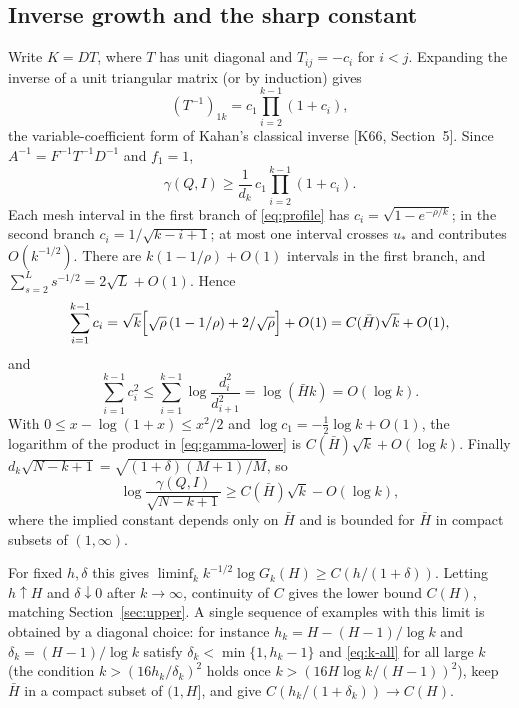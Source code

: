 \documentclass[11pt,a4paper]{article}
\theoremstyle{definition}
\numberwithin{equation}{section}
\begin{document}
\subsection{Inverse growth and the sharp constant}
Write $K=DT$, where $T$ has unit diagonal and $T_{ij}=-c_i$ for $i<j$. Expanding the inverse of a unit triangular
matrix (or by induction) gives
\begin{equation}\label{eq:Tinv}
 (T^{-1})_{1k}=c_1\prod_{i=2}^{k-1}(1+c_i),
\end{equation}
the variable-coefficient form of Kahan's classical inverse [K66, Section~5]. Since $A^{-1}=F^{-1}T^{-1}D^{-1}$ and
$f_1=1$,
\begin{equation}\label{eq:gamma-lower}
 \gamma(Q,I)\ge\frac1{d_k}\,c_1\prod_{i=2}^{k-1}(1+c_i).
\end{equation}
Each mesh interval in the first branch of \eqref{eq:profile} has $c_i=\sqrt{1-e^{-\rho/k}}$; in the second branch
$c_i=1/\sqrt{k-i+1}$; at most one interval crosses $u_*$ and contributes $O(k^{-1/2})$. There are
$k(1-1/\rho)+O(1)$ intervals in the first branch, and $\sum_{s=2}^Ls^{-1/2}=2\sqrt L+O(1)$. Hence
\begin{equation}\label{eq:sum-c}
 \sum_{i=1}^{k-1}c_i=\sqrt k\Bigl[\sqrt\rho\,(1-1/\rho)+2/\sqrt\rho\Bigr]+O(1)=C(\bar H)\sqrt k+O(1),
\end{equation}
and
\begin{equation}\label{eq:sum-c2}
 \sum_{i=1}^{k-1}c_i^2\le\sum_{i=1}^{k-1}\log\frac{d_i^2}{d_{i+1}^2}=\log(\bar Hk)=O(\log k).
\end{equation}
With $0\le x-\log(1+x)\le x^2/2$ and $\log c_1=-\tfrac12\log k+O(1)$, the logarithm of the product in
\eqref{eq:gamma-lower} is $C(\bar H)\sqrt k+O(\log k)$. Finally $d_k\sqrt{N-k+1}=\sqrt{(1+\delta)(M+1)/M}$, so
\begin{equation}\label{eq:lower-final}
 \log\frac{\gamma(Q,I)}{\sqrt{N-k+1}}\ge C(\bar H)\sqrt k-O(\log k),
\end{equation}
where the implied constant depends only on $\bar H$ and is bounded for $\bar H$ in compact subsets of $(1,\infty)$.

For fixed $h,\delta$ this gives $\liminf_k k^{-1/2}\log G_k(H)\ge C(h/(1+\delta))$. Letting $h\uparrow H$ and
$\delta\downarrow0$ after $k\to\infty$, continuity of $C$ gives the lower bound $C(H)$, matching
Section~\ref{sec:upper}. A single sequence of examples with this limit is obtained by a diagonal choice: for
instance $h_k=H-(H-1)/\log k$ and $\delta_k=(H-1)/\log k$ satisfy $\delta_k<\min\{1,h_k-1\}$ and \eqref{eq:k-all} for
all large $k$ (the condition $k>(16h_k/\delta_k)^2$ holds once $k>(16H\log k/(H-1))^2$), keep $\bar H$ in a compact subset of $(1,H]$, and
give $C(h_k/(1+\delta_k))\to C(H)$.
\end{document}

